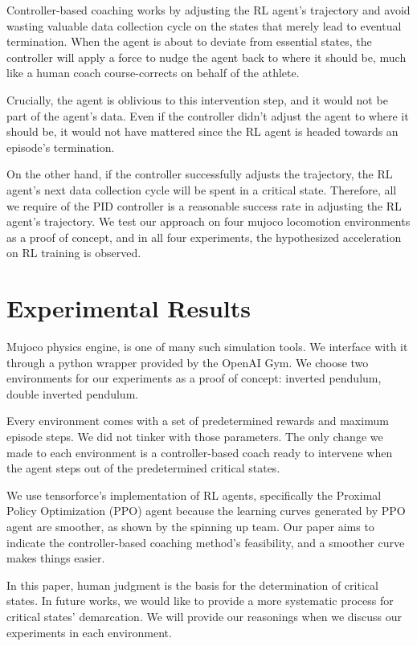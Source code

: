 \documentclass{IJCAS}
\begin{document}
Controller-based coaching works by adjusting the RL agent's trajectory and avoid wasting valuable data collection cycle on the states that merely lead to eventual termination. When the agent is about to deviate from essential states, the controller will apply a force to nudge the agent back to where it should be, much like a human coach course-corrects on behalf of the athlete. 

Crucially, the agent is oblivious to this intervention step, and it would not be part of the agent's data. Even if the controller didn't adjust the agent to where it should be, it would not have mattered since the RL agent is headed towards an episode's termination. 

On the other hand, if the controller successfully adjusts the trajectory, the RL agent's next data collection cycle will be spent in a critical state. Therefore, all we require of the PID controller is a reasonable success rate in adjusting the RL agent's trajectory. We test our approach on four mujoco locomotion environments as a proof of concept, and in all four experiments, the hypothesized acceleration on RL training is observed.

\section{Experimental Results}
Mujoco physics engine\cite{6386109}, is one of many such simulation tools. We interface with it through a python wrapper provided by the OpenAI Gym\cite{Brockman2016OpenAIG}. We choose two environments for our experiments as a proof of concept: inverted pendulum, double inverted pendulum. 

Every environment comes with a set of predetermined rewards and maximum episode steps. We did not tinker with those parameters. The only change we made to each environment is a controller-based coach ready to intervene when the agent steps out of the predetermined critical states.

We use tensorforce's\cite{tensorforce} implementation of RL agents, specifically the Proximal Policy Optimization (PPO) agent because the learning curves generated by PPO agent are smoother, as shown by the spinning up\cite{SpinningUp2018} team. Our paper aims to indicate the controller-based coaching method's feasibility, and a smoother curve makes things easier. 

In this paper, human judgment is the basis for the determination of critical states. In future works, we would like to provide a more systematic process for critical states' demarcation. We will provide our reasonings when we discuss our experiments in each environment. 
\end{document}
